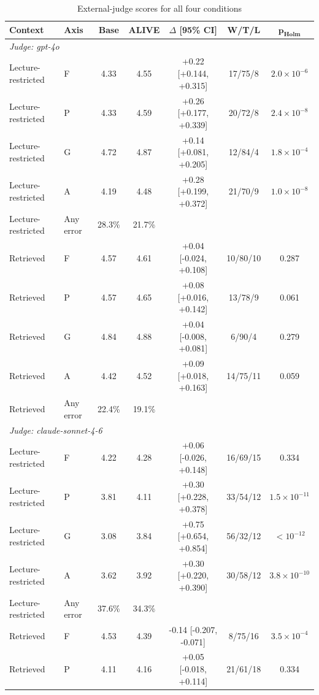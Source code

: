 \begin{table}[!htbp]
\centering
\caption{External-judge scores for all four conditions}
\label{tab:sup_judge}
\small
\begin{tabular}{llccccc}
\toprule
\textbf{Context} & \textbf{Axis} & \textbf{Base} & \textbf{ALIVE} & \textbf{$\Delta$ [95\% CI]} & \textbf{W/T/L} & $\boldsymbol{p_{\textrm{Holm}}}$ \\
\midrule
\multicolumn{7}{l}{\textit{Judge: gpt-4o}} \\
Lecture-restricted & F & 4.33 & 4.55 & +0.22 [+0.144, +0.315] & 17/75/8 & $2.0{\times}10^{-6}$ \\
Lecture-restricted & P & 4.33 & 4.59 & +0.26 [+0.177, +0.339] & 20/72/8 & $2.4{\times}10^{-8}$ \\
Lecture-restricted & G & 4.72 & 4.87 & +0.14 [+0.081, +0.205] & 12/84/4 & $1.8{\times}10^{-4}$ \\
Lecture-restricted & A & 4.19 & 4.48 & +0.28 [+0.199, +0.372] & 21/70/9 & $1.0{\times}10^{-8}$ \\
Lecture-restricted & Any error & 28.3\% & 21.7\% & & & \\
Retrieved & F & 4.57 & 4.61 & +0.04 [-0.024, +0.108] & 10/80/10 & 0.287 \\
Retrieved & P & 4.57 & 4.65 & +0.08 [+0.016, +0.142] & 13/78/9 & 0.061 \\
Retrieved & G & 4.84 & 4.88 & +0.04 [-0.008, +0.081] & 6/90/4 & 0.279 \\
Retrieved & A & 4.42 & 4.52 & +0.09 [+0.018, +0.163] & 14/75/11 & 0.059 \\
Retrieved & Any error & 22.4\% & 19.1\% & & & \\
\multicolumn{7}{l}{\textit{Judge: claude-sonnet-4-6}} \\
Lecture-restricted & F & 4.22 & 4.28 & +0.06 [-0.026, +0.148] & 16/69/15 & 0.334 \\
Lecture-restricted & P & 3.81 & 4.11 & +0.30 [+0.228, +0.378] & 33/54/12 & $1.5{\times}10^{-11}$ \\
Lecture-restricted & G & 3.08 & 3.84 & +0.75 [+0.654, +0.854] & 56/32/12 & $<10^{-12}$ \\
Lecture-restricted & A & 3.62 & 3.92 & +0.30 [+0.220, +0.390] & 30/58/12 & $3.8{\times}10^{-10}$ \\
Lecture-restricted & Any error & 37.6\% & 34.3\% & & & \\
Retrieved & F & 4.53 & 4.39 & -0.14 [-0.207, -0.071] & 8/75/16 & $3.5{\times}10^{-4}$ \\
Retrieved & P & 4.11 & 4.16 & +0.05 [-0.018, +0.114] & 21/61/18 & 0.334 \\

\end{tabular}
\end{table}
